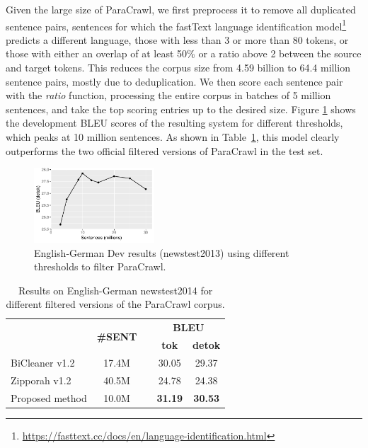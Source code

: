 \documentclass[11pt,a4paper]{article}
\begin{document}
Given the large size of ParaCrawl, we first preprocess it to remove all duplicated sentence pairs, sentences for which the fastText language identification model\footnote{\url{https://fasttext.cc/docs/en/language-identification.html}} predicts a different language, those with less than 3 or more than 80 tokens, or those with either an overlap of at least 50\% or a ratio above 2 between the source and target tokens. This reduces the corpus size from 4.59 billion to 64.4 million sentence pairs, mostly due to deduplication. We then score each sentence pair with the \textit{ratio} function, processing the entire corpus in batches of 5 million sentences, and take the top scoring entries up to the desired size. Figure \ref{fig:mt_dev} shows the development BLEU scores of the resulting system for different thresholds, which peaks at 10 million sentences. As shown in Table~\ref{tab:results_paracrawl}, this model clearly outperforms the two official filtered versions of ParaCrawl in the test set.


\begin{figure}[t] \centering
\includegraphics[width=0.40\textwidth]{fig/mt-dev.pdf}
\caption{English-German Dev results (newstest2013) using different thresholds to filter ParaCrawl.}
\label{fig:mt_dev}
\end{figure}

\begin{table}[t]
\begin{small}
\begin{center}
  \begin{tabular}{lcccc}
    \toprule
    & \multirow{2}{*}{\bf \#SENT} & & \multicolumn{2}{c}{\bf BLEU} \\
    \cmidrule{4-5}
    & & & \bf tok & \bf detok \\
    \midrule
    BiCleaner v1.2 & 17.4M & & 30.05 & 29.37 \\
    Zipporah v1.2 & 40.5M & & 24.78 & 24.38 \\
    \midrule
    Proposed method & 10.0M & & \bf 31.19 & \bf 30.53 \\
    \bottomrule
  \end{tabular}
\end{center}
\end{small}
\caption{Results on English-German newstest2014 for different filtered versions of the ParaCrawl corpus.}
\label{tab:results_paracrawl}
\end{table}
\end{document}

